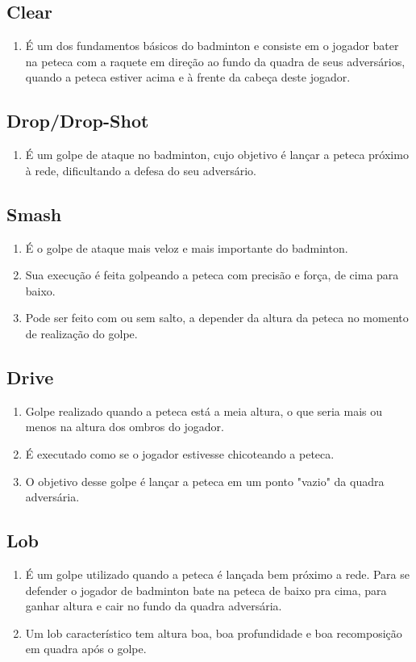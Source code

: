 \documentclass[
	article,			%
	11pt,				%
	oneside,			%
	a4paper,			%
	english,			%
	brazil,				%
	sumario=tradicional
	]{abntex2}
\begin{document}
\subsection{Clear}
\begin{enumerate}
	\item É um dos fundamentos básicos do badminton e consiste em o jogador bater na peteca com a raquete em direção ao fundo da quadra de seus adversários, quando a peteca estiver acima e à frente da cabeça deste jogador.
\end{enumerate}

\subsection{Drop/Drop-Shot}
\begin{enumerate}
	\item É um golpe de ataque no badminton, cujo objetivo é lançar a peteca próximo à rede, dificultando a defesa do seu adversário.
\end{enumerate}

\subsection{Smash}
\begin{enumerate}
	\item É o golpe de ataque mais veloz e mais importante do badminton.
	\item Sua execução é feita golpeando a peteca com precisão e força, de cima para baixo.
	\item Pode ser feito com ou sem salto, a depender da altura da peteca no momento de realização do golpe.
\end{enumerate}

\subsection{Drive}
\begin{enumerate}
	\item Golpe realizado quando a peteca está a meia altura, o que seria mais ou menos na altura dos ombros do jogador.
	\item É executado como se o jogador estivesse chicoteando a peteca.
	\item O objetivo desse golpe é lançar a peteca em um ponto "vazio" da quadra adversária.
\end{enumerate}

\subsection{Lob}
\begin{enumerate}
	\item É um golpe utilizado quando a peteca é lançada bem próximo a rede. Para se defender o jogador de badminton bate na peteca de baixo pra cima, para ganhar altura e cair no fundo da quadra adversária.
	\item Um lob característico tem altura boa, boa profundidade e boa recomposição em quadra após o golpe.
\end{enumerate}
\end{document}
